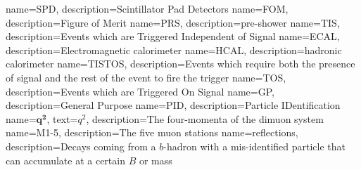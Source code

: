                  {
                   name=SPD,
                   description={Scintillator Pad Detectors}
                                    }
                 {
                   name=FOM,
                   description={Figure of Merit}
                                    }                                    
                 {
                   name=PRS,
                   description={pre-shower}
                                    }                                    
                 {
                   name=TIS,
                   description={Events which are Triggered Independent of Signal}
                                    }
                 {
                   name=ECAL,
                   description={Electromagnetic calorimeter}
                                    }
                 {
                   name=HCAL,
                   description={hadronic calorimeter}
                                    }                                    
                 {
                   name=TISTOS,
                   description={Events which require both the presence of signal and the rest of the event to fire the trigger}
                                    }                                    
                 {
                   name=TOS,
                   description={Events which are Triggered On Signal}
                                    }                                    
                 {
                   name=GP,
                   description={General Purpose}                                 }                  
                 {
                  name=PID,
                  description={Particle IDentification} 
                 }                 
                 {
                   name=$\mathbold{q^{2}}$,
                  text=$q^{2}$,
                  description={The four-momenta of the dimuon system}
                 }
                 {
                   name=M1-5,
                   description={The five muon stations}
                 }
                 {
                   name=reflections,
                                      description={Decays coming from a $b$-hadron with a mis-identified particle that can accumulate at a certain $B$ or \Lb mass}
                 }

